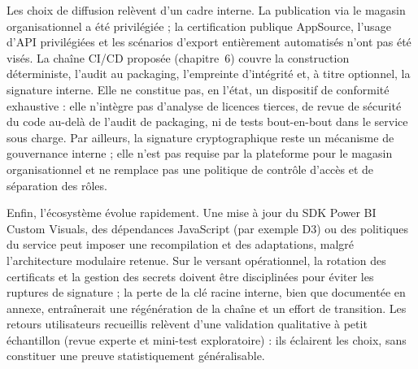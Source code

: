 Les choix de diffusion relèvent d’un cadre interne. La publication via le magasin organisationnel a été privilégiée ; la certification publique AppSource, l’usage d’API privilégiées et les scénarios d’export entièrement automatisés n’ont pas été visés. La chaîne CI/CD proposée (chapitre~6) couvre la construction déterministe, l’audit au packaging, l’empreinte d’intégrité et, à titre optionnel, la signature interne. Elle ne constitue pas, en l’état, un dispositif de conformité exhaustive : elle n’intègre pas d’analyse de licences tierces, de revue de sécurité du code au-delà de l’audit de packaging, ni de tests bout-en-bout dans le service sous charge. Par ailleurs, la signature cryptographique reste un mécanisme de gouvernance interne ; elle n’est pas requise par la plateforme pour le magasin organisationnel et ne remplace pas une politique de contrôle d’accès et de séparation des rôles.

Enfin, l’écosystème évolue rapidement. Une mise à jour du SDK Power BI Custom Visuals, des dépendances JavaScript (par exemple D3) ou des politiques du service peut imposer une recompilation et des adaptations, malgré l’architecture modulaire retenue. Sur le versant opérationnel, la rotation des certificats et la gestion des secrets doivent être disciplinées pour éviter les ruptures de signature ; la perte de la clé racine interne, bien que documentée en annexe, entraînerait une régénération de la chaîne et un effort de transition. Les retours utilisateurs recueillis relèvent d’une validation qualitative à petit échantillon (revue experte et mini-test exploratoire) : ils éclairent les choix, sans constituer une preuve statistiquement généralisable.
